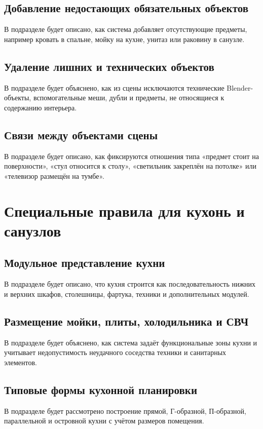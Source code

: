 \documentclass[times]{itmo-student-thesis}
\begin{document}
\subsection{Добавление недостающих обязательных объектов}
В подразделе будет описано, как система добавляет отсутствующие предметы, например кровать в спальне, мойку на кухне, унитаз или раковину в санузле.

\subsection{Удаление лишних и технических объектов}
В подразделе будет объяснено, как из сцены исключаются технические Blender-объекты, вспомогательные меши, дубли и предметы, не относящиеся к содержанию интерьера.

\subsection{Связи между объектами сцены}
В подразделе будет описано, как фиксируются отношения типа «предмет стоит на поверхности», «стул относится к столу», «светильник закреплён на потолке» или «телевизор размещён на тумбе».

\section{Специальные правила для кухонь и санузлов}

\subsection{Модульное представление кухни}
В подразделе будет описано, что кухня строится как последовательность нижних и верхних шкафов, столешницы, фартука, техники и дополнительных модулей.

\subsection{Размещение мойки, плиты, холодильника и СВЧ}
В подразделе будет объяснено, как система задаёт функциональные зоны кухни и учитывает недопустимость неудачного соседства техники и санитарных элементов.

\subsection{Типовые формы кухонной планировки}
В подразделе будет рассмотрено построение прямой, Г-образной, П-образной, параллельной и островной кухни с учётом размеров помещения.
\end{document}
